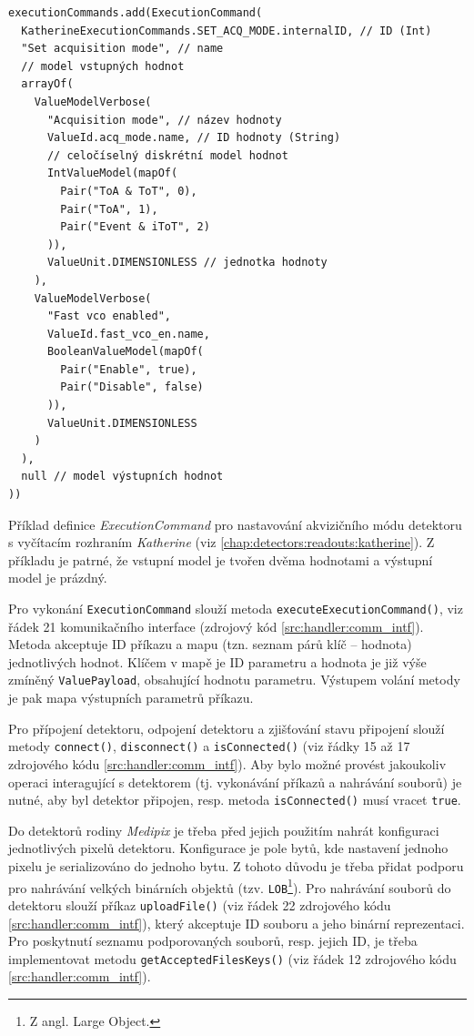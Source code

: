 \begin{code}[h!]
\begin{verbatim}
executionCommands.add(ExecutionCommand(
  KatherineExecutionCommands.SET_ACQ_MODE.internalID, // ID (Int)
  "Set acquisition mode", // name
  // model vstupných hodnot
  arrayOf(
    ValueModelVerbose(
      "Acquisition mode", // název hodnoty
      ValueId.acq_mode.name, // ID hodnoty (String)
	  // celočíselný diskrétní model hodnot
	  IntValueModel(mapOf(
        Pair("ToA & ToT", 0),
        Pair("ToA", 1),
        Pair("Event & iToT", 2)
      )),
      ValueUnit.DIMENSIONLESS // jednotka hodnoty
    ), 
    ValueModelVerbose(
      "Fast vco enabled",
      ValueId.fast_vco_en.name,
      BooleanValueModel(mapOf(
        Pair("Enable", true),
        Pair("Disable", false)
      )),
      ValueUnit.DIMENSIONLESS
	)
  ),
  null // model výstupních hodnot
))
\end{verbatim}
\caption{Příklad definice \textit{ExecutionCommand} pro nastavování akvizičního módu detektoru s vyčítacím rozhraním \textit{Katherine} (viz \ref{chap:detectors:readouts:katherine}). Z příkladu je patrné, že vstupní model je tvořen dvěma hodnotami a výstupní model je prázdný.}
\label{src:handler:execution_command}
\end{code}

Pro vykonání \texttt{ExecutionCommand} slouží metoda \texttt{executeExecutionCommand()}, viz řádek 21 komunikačního interface (zdrojový kód \ref{src:handler:comm_intf}). Metoda akceptuje ID příkazu a mapu (tzn. seznam párů klíč -- hodnota) jednotlivých hodnot. Klíčem v mapě je ID parametru a hodnota je již výše zmíněný \texttt{ValuePayload}, obsahující hodnotu parametru. Výstupem volání metody je pak mapa výstupních parametrů příkazu.

Pro přípojení detektoru, odpojení detektoru a zjišťování stavu připojení slouží metody \texttt{connect()}, \texttt{disconnect()} a \texttt{isConnected()} (viz řádky 15 až 17 zdrojového kódu \ref{src:handler:comm_intf}). Aby bylo možné provést jakoukoliv operaci interagující s detektorem (tj. vykonávání příkazů a nahrávání souborů) je nutné, aby byl detektor připojen, resp. metoda \texttt{isConnected()} musí vracet \texttt{true}.

Do detektorů rodiny \textit{Medipix} je třeba před jejich použitím nahrát konfiguraci jednotlivých pixelů detektoru. Konfigurace je pole bytů, kde nastavení jednoho pixelu je serializováno do jednoho bytu. Z tohoto důvodu je třeba přidat podporu pro nahrávání velkých binárních objektů (tzv. \texttt{LOB}\footnote{Z angl. Large Object.}).
Pro nahrávání souborů do detektoru slouží příkaz \texttt{uploadFile()} (viz řádek 22 zdrojového kódu \ref{src:handler:comm_intf}), který akceptuje ID souboru a jeho binární reprezentaci. Pro poskytnutí seznamu podporovaných souborů, resp. jejich ID, je třeba implementovat metodu \texttt{getAcceptedFilesKeys()} (viz řádek 12 zdrojového kódu \ref{src:handler:comm_intf}).

